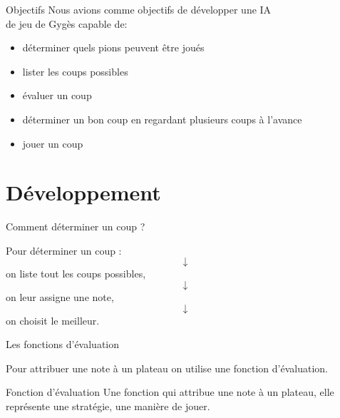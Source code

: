 \documentclass{beamer}
\begin{document}
	\begin{frame}{Objectifs}
		Nous avions comme objectifs de développer une IA\\
		de jeu de Gygès capable de:

		\vspace{1em}
		\begin{itemize}
			\pause \item déterminer quels pions peuvent être joués
			\vspace{0.75em}
			\pause \item lister les coups possibles
			\vspace{0.75em}
			\pause \item évaluer un coup
			\vspace{0.75em}
			\pause \item déterminer un bon coup en regardant plusieurs coups à l'avance
			\vspace{0.75em}
			\pause \item jouer un coup
		\end{itemize}
	\end{frame}

	\section{Développement}

	\begin{frame}{Comment déterminer un coup ?}
		\centering

		Pour déterminer un coup :
		\pause $$\downarrow$$
		on liste tout les coups possibles\pause{},
		$$\downarrow$$
		on leur assigne une note\pause{},
		$$\downarrow$$
		on choisit le meilleur.
	\end{frame}

	\begin{frame}{Les fonctions d'évaluation}

		Pour attribuer une note à un plateau on utilise une
		\alert{fonction d'évaluation}.

		\vspace{1em}
		\begin{block}{Fonction d'évaluation}
		\vspace{0.75em}
			Une fonction qui attribue une note à un
			plateau, elle représente une stratégie,
			une manière de jouer.
		\vspace{0.75em}
		\end{block}
		\vspace{1em}


	\end{frame}
\end{document}

